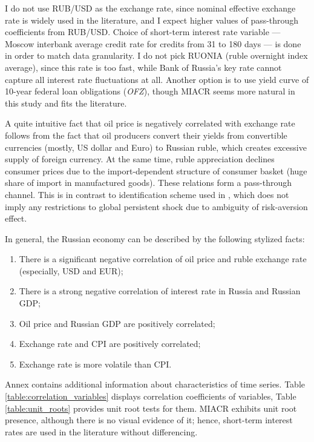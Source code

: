 \documentclass[12pt, a4paper]{extarticle}
\begin{document}
I do not use RUB/USD as the exchange rate, since nominal effective exchange rate is widely used in the literature, and I expect higher values of pass-through coefficients from RUB/USD. Choice of short-term interest rate variable --- Moscow interbank average credit rate for credits from 31 to 180 days --- is done in order to match data granularity. I do not pick RUONIA (ruble overnight index average), since this rate is too fast, while Bank of Russia's key rate cannot capture all interest rate fluctuations at all. Another option is to use yield curve of 10-year federal loan obligations (\textit{OFZ}), though MIACR seems more natural in this study and fits the literature.

A quite intuitive fact that oil price is negatively correlated with exchange rate follows from the fact that oil producers convert their yields from convertible currencies (mostly, US dollar and Euro) to Russian ruble, which creates excessive supply of foreign currency. At the same time, ruble appreciation declines consumer prices due to the import-dependent structure of consumer basket (huge share of import in manufactured goods). These relations form a pass-through channel. This is in contrast to identification scheme used in \parencite{Forbes2018}, which does not imply any restrictions to global persistent shock due to ambiguity of risk-aversion effect.

In general, the Russian economy can be described by the following stylized facts:
\begin{enumerate}
	\setlength\itemsep{0.02em}
	\item There is a significant negative correlation of oil price and ruble exchange rate (especially, USD and EUR);
	\item There is a strong negative correlation of interest rate in Russia and Russian GDP;
	\item Oil price and Russian GDP are positively correlated;
	\item Exchange rate and CPI are positively correlated;
	\item Exchange rate is more volatile than CPI.
\end{enumerate}

Annex contains additional information about characteristics of time series. Table \ref{table:correlation_variables} displays correlation coefficients of variables, Table \ref{table:unit_roots} provides unit root tests for them. \mbox{MIACR} exhibits unit root presence, although there is no visual evidence of it; hence, short-term interest rates are used in the literature without differencing.
\end{document}
